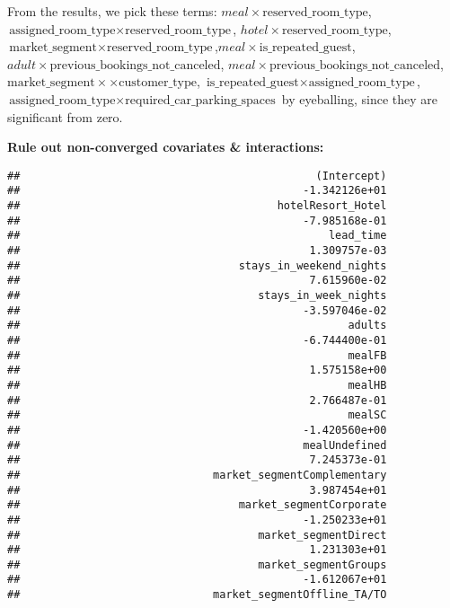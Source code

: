 \documentclass[
]{article}
\begin{document}
From the results, we pick these terms:
\(meal \times \text{reserved_room_type}\),
\(\text{assigned_room_type} \times \text{reserved_room_type}\),
\(hotel \times \text{reserved_room_type}\),
\(\text{market_segment} \times \text{reserved_room_type}\),\(meal \times \text{is_repeated_guest}\),
\(adult \times \text{previous_bookings_not_canceled}\),
\(meal \times \text{previous_bookings_not_canceled}\),
\(\text{market_segment}\times \times \text{customer_type}\),
\(\text{is_repeated_guest} \times \text{assigned_room_type}\),
\(\text{assigned_room_type} \times \text{required_car_parking_spaces}\)
by eyeballing, since they are significant from zero.

\textbf{Rule out non-converged covariates \& interactions:}

\begin{verbatim}
##                                              (Intercept) 
##                                            -1.342126e+01 
##                                        hotelResort_Hotel 
##                                            -7.985168e-01 
##                                                lead_time 
##                                             1.309757e-03 
##                                  stays_in_weekend_nights 
##                                             7.615960e-02 
##                                     stays_in_week_nights 
##                                            -3.597046e-02 
##                                                   adults 
##                                            -6.744400e-01 
##                                                   mealFB 
##                                             1.575158e+00 
##                                                   mealHB 
##                                             2.766487e-01 
##                                                   mealSC 
##                                            -1.420560e+00 
##                                            mealUndefined 
##                                             7.245373e-01 
##                              market_segmentComplementary 
##                                             3.987454e+01 
##                                  market_segmentCorporate 
##                                            -1.250233e+01 
##                                     market_segmentDirect 
##                                             1.231303e+01 
##                                     market_segmentGroups 
##                                            -1.612067e+01 
##                              market_segmentOffline_TA/TO 

\end{verbatim}
\end{document}
